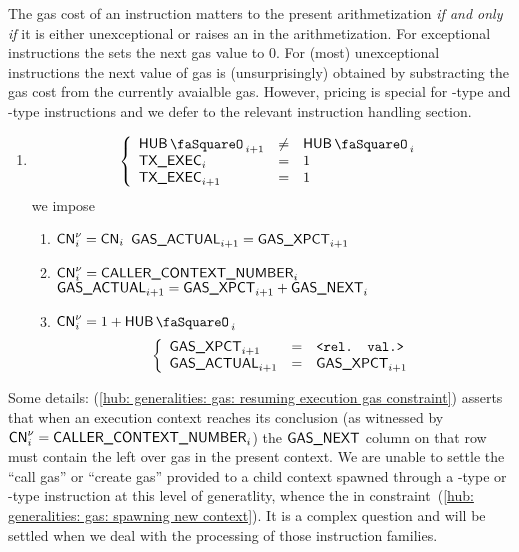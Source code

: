 The gas cost of an instruction matters to the present arithmetization \emph{if and only if} it is either unexceptional or raises an \oogxSH{} in the arithmetization.
For exceptional instructions the \zkEvm{} sets the next gas value to $0$.
For (most) unexceptional instructions the next value of gas is (unsurprisingly) obtained by substracting the gas cost from the currently avaialble gas.
However, pricing is special for -type and -type instructions and we defer to the relevant instruction handling section.
\begin{enumerate}[resume]
	\item \If 
		\[
			\left\{ \begin{array}{lcl}
				\hubStamp _{i + 1} & \neq & \hubStamp_{i} \\
				\txExec   _{i    } & =    & 1             \\
				\txExec   _{i + 1} & =    & 1             \\
			\end{array} \right.
		\]
		\Then we impose
		\begin{enumerate}
			\item\label{hub: generalities: gas: could blow up} \If $\textsf{CN}^{\nu}_{i} = \textsf{CN}_{i}$ \Then $\textsf{GAS}\textsf{\_ACTUAL}_{i + 1} = \textsf{GAS}\textsf{\_XPCT}_{i + 1}$
			\item\label{hub: generalities: gas: resuming execution gas constraint} \If $\textsf{CN}^{\nu}_{i} = \textsf{CALLER\_CONTEXT\_NUMBER}_{i}$ \Then
				$\textsf{GAS}\textsf{\_ACTUAL}_{i + 1} = \textsf{GAS}\textsf{\_XPCT}_{i + 1} + \textsf{GAS}\textsf{\_NEXT}_{i}$
			\item\label{hub: generalities: gas: spawning new context} \If $\cn\new_{i} = 1 + \hubStamp_{i}$ \Then 
				\[
					\left\{ \begin{array}{lcl}
						\textsf{GAS}\textsf{\_XPCT}_{i + 1} & = & \texttt{<rel. val.>}            \\
						\textsf{GAS}\textsf{\_ACTUAL}_{i + 1}   & = & \textsf{GAS}\textsf{\_XPCT}_{i + 1} \\
					\end{array} \right.
				\]
		\end{enumerate}
\end{enumerate}
Some details:
(\ref{hub: generalities: gas: resuming execution gas constraint}) asserts that when an execution context reaches its conclusion (as witnessed by $\textsf{CN}^{\nu}_{i} = \textsf{CALLER\_CONTEXT\_NUMBER}_{i}$) the $\textsf{GAS}\textsf{\_NEXT}$ column on that row must contain the left over gas in the present context.
We are unable to settle the ``call gas'' or ``create gas'' provided to a child context spawned through a -type or -type instruction at this level of generatlity, whence the \relevantValue{} in constraint~(\ref{hub: generalities: gas: spawning new context}). It is a complex question and will be settled when we deal with the processing of those instruction families.

